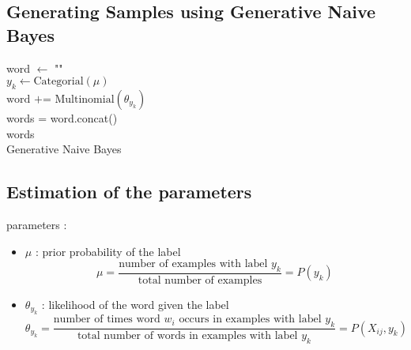 
\subsection*{Generating Samples using Generative Naive Bayes}
\begin{algorithm}[H]
	\SetAlgoLined
	\SetNoFillComment
	word $ \leftarrow $ "" \\
	 {
		$y_k \leftarrow \text{Categorial}(\mu)$ \\
		$\text{word += Multinomial}(\theta_{y_k})$ \\
	}
	words = word.concat() \\
	\Return words \\
	\caption{Generative Naive Bayes}
\end{algorithm}

\subsection*{Estimation of the parameters}
parameters :
\begin{itemize}
	\item $\mu$ : prior probability of the label
	$$\mu = \frac{\text{number of examples with label } y_k}{\text{total number of examples}} = P(y_k) $$
	\item $\theta_{y_k}$ : likelihood of the word given the label
	$$\theta_{y_k} = \frac{\text{number of times word } w_i \text{ occurs in examples with label } y_k}{\text{total number of words in examples with label } y_k} = P(X_{ij}, y_k) $$
\end{itemize}

